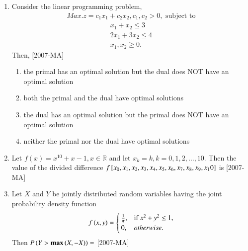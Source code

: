 \documentclass[journal]{IEEEtran}
\begin{document}
\begin{enumerate}
\item Consider the linear programming problem, 
\begin{align*}
    Max. z=c_1 x_1 + c_2 x_2, c_1, c_2>0, \text{ subject to}
\end{align*}
\begin{align*}    
    x_1+x_2 \leq 3\\
    2x_1+3x_2 \leq 4\\
    x_1,x_2 \geq 0.
\end{align*}
Then, \hfill{[2007-MA]}
\begin{enumerate}
    \item the primal has an optimal solution but the dual does NOT have an optimal solution
    \item both the primal and the dual have optimal solutions 
    \item the dual has an optimal solution but the primal does NOT have an optimal solution
    \item neither the primal nor the dual have optimal solutions
\end{enumerate}

\item Let $f(x)=x^{10}+x-1, x \in \mathbb R$ and let $x_k=k, k=0,1,2,\dots,10$. Then the value of the divided difference $f{}\left[x_0,x_1,x_2,x_3,x_4,x_5,x_6,x_7,x_8,x_9,x_10\right]$ is \hfill{[2007-MA]}
\begin{enumerate}
\end{enumerate}

\item Let $X$ and $Y$ be jointly distributed random variables having the joint probability density function
\begin{align*}
    f\left(x,y\right)= \begin{cases} 
\frac{1}{\pi}, & \text{if } x^2+y^2 \leq 1,\\
0, & otherwise. \\
\end{cases}
\end{align*}
Then $P\left(Y>\textbf{max}\left(X,-X\right)\right)=$ \hfill{[2007-MA]}
\begin{enumerate}
\end{enumerate}


\end{enumerate}
\end{document}
